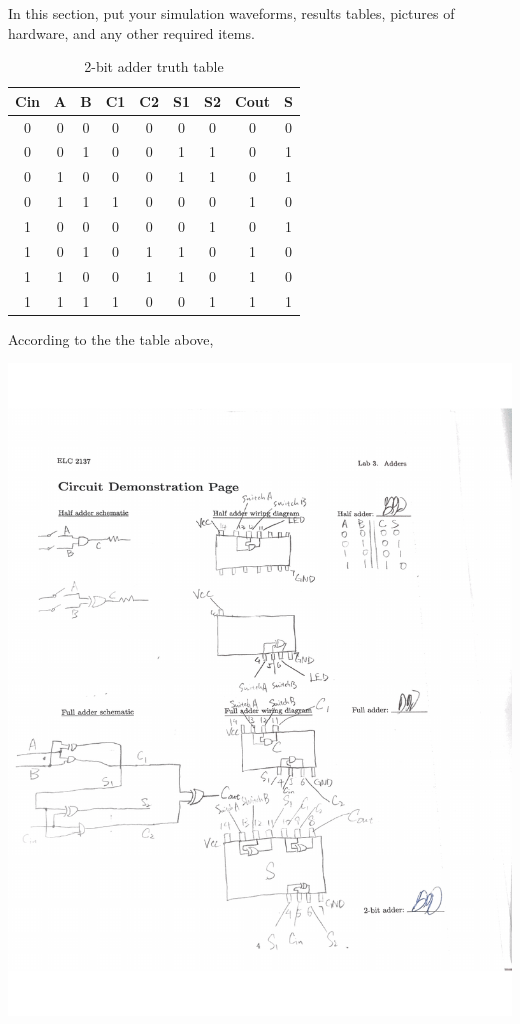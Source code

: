 \documentclass[11pt]{article}
\begin{document}
In this section, put your simulation waveforms, results tables, pictures of hardware, and any other required items.\begin{table}[ht]\centering
	\caption{2-bit adder truth table}
	\label{tbl:example_table}
	\begin{tabular}{ccc|cc|cc|cc}
		\toprule
		Cin & A & B & C1 & C2 & S1 & S2 & Cout & S \\
		\midrule
		0 & 0 & 0 & 0 & 0 & 0 & 0 & 0 & 0\\
		0 & 0 & 1 & 0 & 0 & 1 & 1 & 0 & 1 \\
		0 & 1 & 0 & 0 & 0 & 1 & 1 & 0 & 1 \\
		0 & 1 & 1 & 1 & 0 & 0 & 0 & 1 & 0 \\
		1 & 0 & 0 & 0 & 0 & 0 & 1 & 0 & 1 \\
		1 & 0 & 1 & 0 & 1 & 1 & 0 & 1 & 0 \\
		1 & 1 & 0 & 0 & 1 & 1 & 0 & 1 & 0 \\
		1 & 1 & 1 & 1 & 0 & 0 & 1 & 1 & 1 \\
		\bottomrule
	\end{tabular} 
\end{table}
According to the the table above, 

\includegraphics[width=\textwidth]{"circuit demonstration page"}
\end{document}
